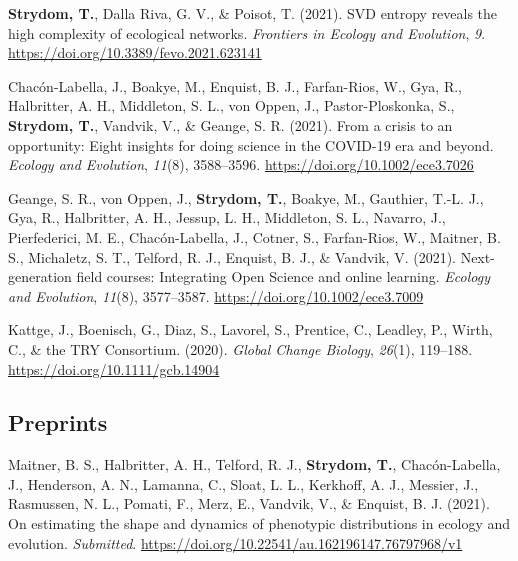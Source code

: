\documentclass[11pt, a4paper]{awesome-cv}
\begin{document}
\hypertarget{refs_journals}{}
\leavevmode\hypertarget{ref-StrydomSVDEnt2020}{}%
\textbf{Strydom, T.}, Dalla Riva, G. V., \& Poisot, T. (2021). SVD entropy reveals the high complexity of ecological networks. \emph{Frontiers in Ecology and Evolution}, \emph{9}. \url{https://doi.org/10.3389/fevo.2021.623141}

\leavevmode\hypertarget{ref-Chac_2020}{}%
Chacón-Labella, J., Boakye, M., Enquist, B. J., Farfan-Rios, W., Gya, R., Halbritter, A. H., Middleton, S. L., von Oppen, J., Pastor-Ploskonka, S., \textbf{Strydom, T.}, Vandvik, V., \& Geange, S. R. (2021). From a crisis to an opportunity: {Eight} insights for doing science in the {COVID}-19 era and beyond. \emph{Ecology and Evolution}, \emph{11}(8), 3588--3596. \url{https://doi.org/10.1002/ece3.7026}

\leavevmode\hypertarget{ref-Geange_2020}{}%
Geange, S. R., von Oppen, J., \textbf{Strydom, T.}, Boakye, M., Gauthier, T.-L. J., Gya, R., Halbritter, A. H., Jessup, L. H., Middleton, S. L., Navarro, J., Pierfederici, M. E., Chacón-Labella, J., Cotner, S., Farfan-Rios, W., Maitner, B. S., Michaletz, S. T., Telford, R. J., Enquist, B. J., \& Vandvik, V. (2021). Next-generation field courses: {Integrating Open Science} and online learning. \emph{Ecology and Evolution}, \emph{11}(8), 3577--3587. \url{https://doi.org/10.1002/ece3.7009}

\leavevmode\hypertarget{ref-Kattge_2020}{}%
Kattge, J., Boenisch, G., Diaz, S., Lavorel, S., Prentice, C., Leadley, P., Wirth, C., \& the TRY Consortium. (2020). \emph{Global Change Biology}, \emph{26}(1), 119--188. \url{https://doi.org/10.1111/gcb.14904}

\endgroup
\vspace{\baselineskip}

\hypertarget{preprints}{%
\subsection{\texorpdfstring{\textbf{Preprints}}{Preprints}}\label{preprints}}

\begingroup
\setlength{\parindent}{-0.5in}
\setlength{\leftskip}{0.5in}

\hypertarget{refs_review}{}
\leavevmode\hypertarget{ref-MaitnerEstSha2021}{}%
Maitner, B. S., Halbritter, A. H., Telford, R. J., \textbf{Strydom, T.}, Chacón-Labella, J., Henderson, A. N., Lamanna, C., Sloat, L. L., Kerkhoff, A. J., Messier, J., Rasmussen, N. L., Pomati, F., Merz, E., Vandvik, V., \& Enquist, B. J. (2021). On estimating the shape and dynamics of phenotypic distributions in ecology and evolution. \emph{Submitted}. \url{https://doi.org/10.22541/au.162196147.76797968/v1}
\end{document}
